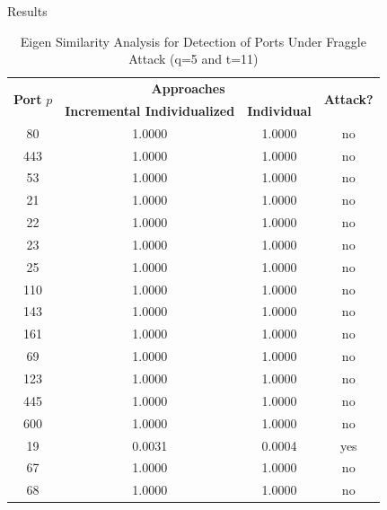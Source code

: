 \documentclass[newPxFont, numfooter, sectionpages]{beamer}
\begin{document}
\begin{frame}{Results}
	
\begin{table}[h!]
  \centering
  \caption{Eigen Similarity Analysis for Detection of Ports Under Fraggle Attack (q=5 and t=11)}
  \label{tab:tab10}
  \begin{tabular}{ c c c c }
	\toprule
	\multirow{2}{*}{\textbf{Port} $p$}   &\multicolumn{2}{c}{\textbf{Approaches}} &\multirow{2}{*}{\textbf{Attack?}}\\ 
			\hhline{~--~}
			&\textbf{Incremental Individualized} &\textbf{Individual}\\
	\midrule
	80 &1.0000 &1.0000 &no \\
	443 &1.0000 &1.0000 &no \\
	53 &1.0000 &1.0000 &no \\
	21 &1.0000 &1.0000 &no \\
	22 &1.0000 &1.0000 &no \\
	23 &1.0000 &1.0000 &no \\
	25 &1.0000 &1.0000 &no \\
	110 &1.0000 &1.0000 &no \\
	143 &1.0000 &1.0000 &no \\
	161 &1.0000 &1.0000 &no \\
	69 &1.0000 &1.0000 &no \\
	123 &1.0000 &1.0000 &no \\
	445 &1.0000 &1.0000 &no \\
	600 &1.0000 &1.0000 &no \\
	19 &0.0031 &0.0004 &yes \\
	67 &1.0000 &1.0000 &no \\
	68 &1.0000 &1.0000 &no \\
    \bottomrule
  \end{tabular}
\end{table}
	
\end{frame}
\end{document}
